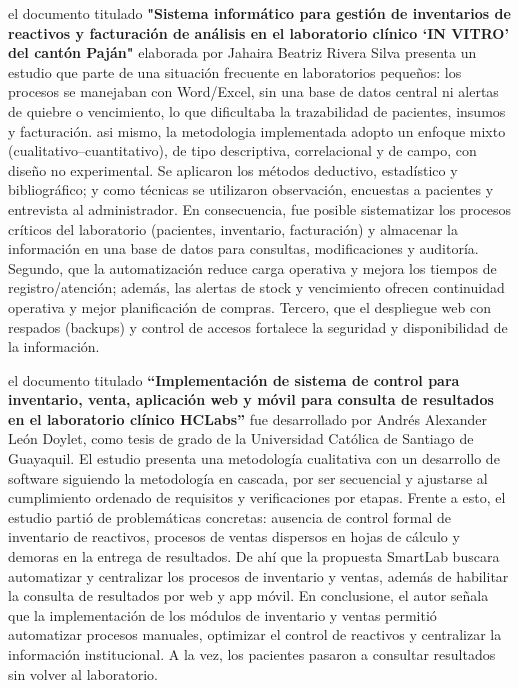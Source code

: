 \documentclass[12pt]{article} %
\begin{document}
el documento titulado \textbf{"Sistema informático para gestión de inventarios de reactivos y facturación de análisis en el laboratorio clínico ‘IN VITRO’ del cantón Paján"} elaborada por Jahaira Beatriz Rivera Silva presenta un estudio que parte de una situación frecuente en laboratorios pequeños: los procesos se manejaban con Word/Excel, sin una base de datos central ni alertas de quiebre o vencimiento, lo que dificultaba la trazabilidad de pacientes, insumos y facturación. asi mismo, la metodologia implementada adopto un enfoque mixto (cualitativo–cuantitativo), de tipo descriptiva, correlacional y de campo, con diseño no experimental. Se aplicaron los métodos deductivo, estadístico y bibliográfico; y como técnicas se utilizaron observación, encuestas a pacientes y entrevista al administrador. En consecuencia, fue posible sistematizar los procesos críticos del laboratorio (pacientes, inventario, facturación) y almacenar la información en una base de datos para consultas, modificaciones y auditoría. Segundo, que la automatización reduce carga operativa y mejora los tiempos de registro/atención; además, las alertas de stock y vencimiento ofrecen continuidad operativa y mejor planificación de compras. Tercero, que el despliegue web con respados (backups) y control de accesos fortalece la seguridad y disponibilidad de la información.

el documento titulado \textbf{“Implementación de sistema de control para inventario, venta, aplicación web y móvil para consulta de resultados en el laboratorio clínico HCLabs”} fue desarrollado por Andrés Alexander León Doylet, como tesis de grado de la Universidad Católica de Santiago de Guayaquil. El estudio presenta una metodología cualitativa con un desarrollo de software siguiendo la metodología en cascada, por ser secuencial y ajustarse al cumplimiento ordenado de requisitos y verificaciones por etapas. Frente a esto, el estudio partió de problemáticas concretas: ausencia de control formal de inventario de reactivos, procesos de ventas dispersos en hojas de cálculo y demoras en la entrega de resultados. De ahí que la propuesta SmartLab buscara automatizar y centralizar los procesos de inventario y ventas, además de habilitar la consulta de resultados por web y app móvil. En conclusione, el autor señala que la implementación de los módulos de inventario y ventas permitió automatizar procesos manuales, optimizar el control de reactivos y centralizar la información institucional. A la vez, los pacientes pasaron a consultar resultados sin volver al laboratorio.
\end{document}
